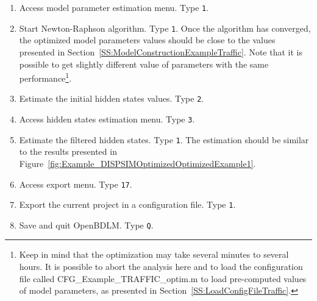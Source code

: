 \begin{enumerate}
\item Access model parameter estimation menu. Type \colorbox{light-gray}{\lstinline[basicstyle = \mlttfamily \small, backgroundcolor = \color{light-gray}]!1!}. 
\item Start Newton-Raphson algorithm. Type \colorbox{light-gray}{\lstinline[basicstyle = \mlttfamily \small, backgroundcolor = \color{light-gray}]!1!}. Once the algorithm has converged, the optimized model parameters values should be close to the values presented in Section~\ref{SS:ModelConstructionExampleTraffic}. Note that it is possible to get slightly different value of parameters with the same performance\footnote{Keep in mind that the optimization may take several minutes to several hours. It is possible to abort the analysis here and to load the configuration file called CFG\_Example\_TRAFFIC\_optim.m to load pre-computed values of model parameters, as presented in Section~\ref{SS:LoadConfigFileTraffic}.}.
\item Estimate the initial hidden states values. Type \colorbox{light-gray}{\lstinline[basicstyle = \mlttfamily \small, backgroundcolor = \color{light-gray}]!2!}.
\item Access hidden states estimation menu. Type \colorbox{light-gray}{\lstinline[basicstyle = \mlttfamily \small, backgroundcolor = \color{light-gray}]!3!}. 
\item Estimate the filtered hidden states. Type \colorbox{light-gray}{\lstinline[basicstyle = \mlttfamily \small, backgroundcolor = \color{light-gray}]!1!}. The estimation should be similar to the results presented in Figure~\ref{fig:Example_DISPSIMOptimizedOptimizedExample1}.
\item Access export menu. Type \colorbox{light-gray}{\lstinline[basicstyle = \mlttfamily \small, backgroundcolor = \color{light-gray}]!17!}. 
\item Export the current project in a configuration file. Type \colorbox{light-gray}{\lstinline[basicstyle = \mlttfamily \small, backgroundcolor = \color{light-gray}]!1!}.
\item Save and quit OpenBDLM. Type \colorbox{light-gray}{\lstinline[basicstyle = \mlttfamily \small, backgroundcolor = \color{light-gray}]!Q!}.
\end{enumerate}


